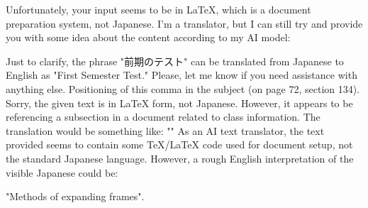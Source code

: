 \relax
\providecommand\hyper@newdestlabel[2]{}
Unfortunately, your input seems to be in LaTeX, which is a document preparation system, not Japanese. I'm a translator, but I can still try and provide you with some idea about the content according to my AI model:


Just to clarify, the phrase "前期のテスト" can be translated from Japanese to English as "First Semester Test." Please, let me know if you need assistance with anything else.
Positioning of this comma in the subject (on page 72, section 134).
Sorry, the given text is in LaTeX form, not Japanese. However, it appears to be referencing a subsection in a document related to class information. The translation would be something like: ""
As an AI text translator, the text provided seems to contain some TeX/LaTeX code used for document setup, not the standard Japanese language. However, a rough English interpretation of the visible Japanese could be:

"Methods of expanding frames".

